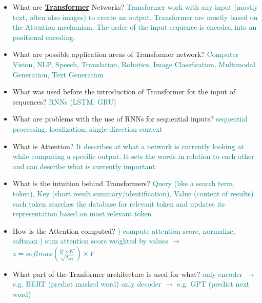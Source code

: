 \documentclass{report}
\newcommand{\asw}[2][teal]{}
\renewcommand{\asw}[2][teal]{\textcolor{#1}{#2}}
\begin{document}
\begin{itemize}
		\item What are \textbf{\underline{Transformer}} Networks?
		\asw{\newline Transformer work with any input (mostly text, often also images) to create an output. Transformer are mostly based on the Attention mechanism. The order of the input sequence is encoded into an positional encoding.}
		\item What are possible application areas of Transformer network?
		\asw{\newline Computer Vision, NLP, Speech, Translation, Robotics, Image Classfication, Multimodal Generation, Text Generation}
		\item What was used before the introduction of Transformer for the input of sequences?
		\asw{\newline RNNs (LSTM, GRU)}
		\item What are problems with the use of RNNs for sequential inputs?
		\asw{\newline sequential processing, localization, single direction context}
		\item What is Attention?
		\asw{\newline It describes at what a network is currently looking at while computing a specific output. It sets the words in relation to each other and can describe what is currently important.}
		\item What is the intuition behind Transformers?
		\asw{\newline Query (like a search term, token),
			\newline Key (short result summary/identification),
			\newline Value (content of results)
			\newline each token searches the database for relevant token and updates its representation based on most relevant token}
		\item How is the Attention computed?
		\asw{) compute attention score, normalize, softmax
		\newline 2) sum attention score weighted by values
		\newline $\rightarrow$ $z = softmax(\frac{Q \times K'}{\sqrt{d_{key}}}) \times V$}
		\item What part of the Tranformer architecture is used for what?
		\asw{\newline only encoder $\rightarrow$ e.g. BERT (predict masked word)
		\newline only decoder $\rightarrow$ e.g. GPT (predict next word)
}
\end{itemize}
\end{document}
